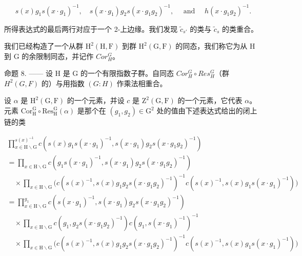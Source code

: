 \[
s (x) g _ {1} s (x \cdot g _ {1}) ^ {- 1}, \quad s (x \cdot g _ {1}) g _ {2} s (x \cdot g _ {1} g _ {2}) ^ {- 1}, \quad \text { and } \quad h (x \cdot g _ {1} g _ {2}) ^ {- 1}.
\]

所得表达式的最后两行对应于一个 2-上边缘。我们发现 \(\widetilde{c}_{s'}\) 的类与 \(\widetilde{c}_s\) 的类重合。

我们已经构造了一个从群 \(\mathrm{H}^{2}(\mathrm{H},\mathrm{F})\) 到群 \(\mathrm{H}^{2}(\mathrm{G},\mathrm{F})\) 的同态，我们称它为从 H 到 G 的余限制同态，并记作 \(Cor_{H}^{G}\)。

命题 8. —— 设 H 是 G 的一个有限指数子群。自同态 \(Cor_{H}^{G} \circ Res_{H}^{G}\)（群 \(H^{2}(G, F)\) 的）与用指数 \((G : H)\) 作乘法相重合。

设 \(\alpha\) 是 \(\mathrm{H}^2 (\mathrm{G},\mathrm{F})\) 的一个元素，并设 \(c\) 是 \(\mathrm{Z}^2 (\mathrm{G},\mathrm{F})\) 的一个元素，它代表 \(\alpha\)。元素 \(\mathrm{Cor}_{\mathrm{H}}^{\mathrm{G}}\circ \mathrm{Res}_{\mathrm{H}}^{\mathrm{G}}(\alpha)\) 是那个在 \((g_{1},g_{2})\in \mathrm{G}^{2}\) 处的值由下述表达式给出的闭上链的类

\[
\begin{array}{l} \prod_ {x \in \mathrm{H} \backslash \mathrm{G}} ^ {s (x) ^ {- 1}} c (s (x) g _ {1} s (x \cdot g _ {1}) ^ {- 1}, s (x \cdot g _ {1}) g _ {2} s (x \cdot g _ {1} g _ {2}) ^ {- 1}) \\ = \prod_ {x \in \mathrm{H} \backslash \mathrm{G}} c (g _ {1} s (x \cdot g _ {1}) ^ {- 1}, s (x \cdot g _ {1}) g _ {2} s (x \cdot g _ {1} g _ {2}) ^ {- 1}) \\ \quad \times \prod_ {x \in \mathrm{H} \backslash \mathrm{G}} \big (c (s (x) ^ {- 1}, s (x) g _ {1} g _ {2} s (x \cdot g _ {1} g _ {2}) ^ {- 1}) ^ {- 1} c (s (x) ^ {- 1}, s (x) g _ {1} s (x \cdot g _ {1}) ^ {- 1}) \big) \\ = \prod_ {x \in \mathrm{H} \backslash \mathrm{G}} ^ {g _ {1}} c (s (x \cdot g _ {1}) ^ {- 1}, s (x \cdot g _ {1}) g _ {2} s (x \cdot g _ {1} g _ {2}) ^ {- 1}) \\ \quad \times \prod_ {x \in \mathrm{H} \backslash \mathrm{G}} c (g _ {1}, g _ {2} s (x \cdot g _ {1} g _ {2}) ^ {- 1}) c (g _ {1}, s (x \cdot g _ {1}) ^ {- 1}) ^ {- 1} \\ \quad \times \prod_ {x \in \mathrm{H} \backslash \mathrm{G}} \big (c (s (x) ^ {- 1}, s (x) g _ {1} g _ {2} s (x \cdot g _ {1} g _ {2}) ^ {- 1}) ^ {- 1} c (s (x) ^ {- 1}, s (x) g _ {1} s (x \cdot g _ {1}) ^ {- 1}) \big) \end{array}
\]

